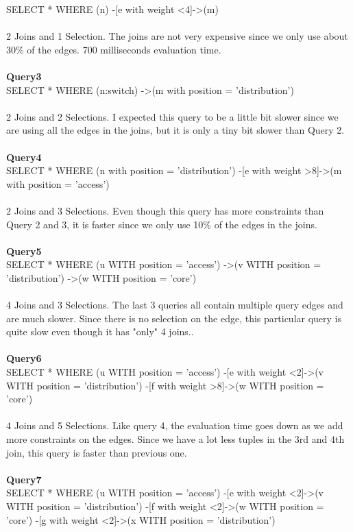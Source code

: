 \documentclass[11pt,singlecolumn]{scrartcl}
\begin{document}
SELECT * WHERE (n) -[e with weight \textless 4]-\textgreater(m)\\\\
2 Joins and 1 Selection. The joins are not very expensive since we only use about 30\% of the edges. 700 milliseconds evaluation time.
\\\\\textbf{Query3}\\
SELECT * WHERE (n:switch) -\textgreater (m with position = 'distribution') \\\\
2 Joins and 2 Selections. I expected this query to be a little bit slower since we are using all the edges in the joins, but it is only a tiny bit slower than Query 2.
\\\\\textbf{Query4}\\
SELECT * WHERE (n with position = 'distribution') -[e with weight \textgreater 8]-\textgreater (m with position = 'access')\\\\
2 Joins and 3 Selections. Even though this query has more constraints than Query 2 and 3, it is faster since we only use 10\% of the edges in the joins. 
\\\\\textbf{Query5}\\
SELECT * WHERE (u WITH position = 'access') -\textgreater (v WITH position = 'distribution') -\textgreater (w WITH position = 'core')\\\\
4 Joins and 3 Selections. The last 3 queries all contain multiple query edges and are much slower. Since there is no selection on the edge, this particular query is quite slow even though it has "only" 4 joins..
\\\\\textbf{Query6}\\
SELECT * WHERE (u WITH position = 'access') -[e with weight  \textless 2]-\textgreater (v WITH position = 'distribution') -[f with weight \textgreater 8]-\textgreater (w WITH position = 'core')\\\\
4 Joins and 5 Selections. Like query 4, the evaluation time goes down as we add more constraints on the edges. Since we have a lot less tuples in the 3rd and 4th join, this query is faster than previous one.
\\\\\textbf{Query7}\\
SELECT * WHERE (u WITH position = 'access') -[e with weight  \textless 2]-\textgreater (v WITH position = 'distribution') -[f with weight  \textless 2]-\textgreater (w WITH position = 'core') -[g with weight  \textless 2]-\textgreater (x WITH position = 'distribution')\\\\
\end{document}
